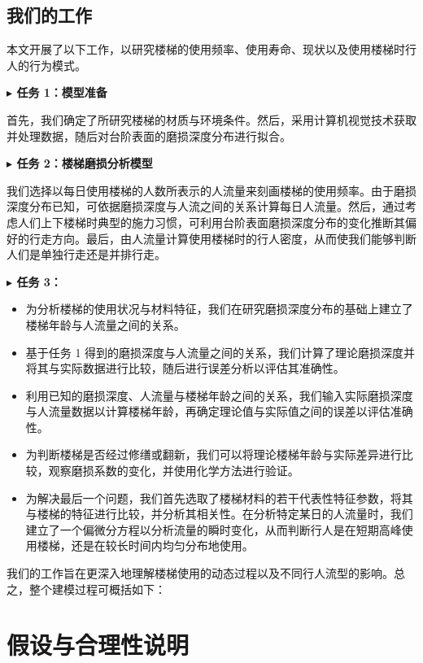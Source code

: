 \documentclass[11pt,a4paper]{ctexart}
\begin{document}
\subsection{我们的工作}

本文开展了以下工作，以研究楼梯的使用频率、使用寿命、现状以及使用楼梯时行人的行为模式。

\noindent\textbf{$\blacktriangleright$ 任务 1：模型准备}

首先，我们确定了所研究楼梯的材质与环境条件。然后，采用计算机视觉技术获取并处理数据，随后对台阶表面的磨损深度分布进行拟合。

\noindent\textbf{$\blacktriangleright$ 任务 2：楼梯磨损分析模型}

我们选择以每日使用楼梯的人数所表示的人流量来刻画楼梯的使用频率。由于磨损深度分布已知，可依据磨损深度与人流之间的关系计算每日人流量。然后，通过考虑人们上下楼梯时典型的施力习惯，可利用台阶表面磨损深度分布的变化推断其偏好的行走方向。最后，由人流量计算使用楼梯时的行人密度，从而使我们能够判断人们是单独行走还是并排行走。

\noindent\textbf{$\blacktriangleright$ 任务 3：}

\begin{itemize}[leftmargin=2em,itemsep=2pt,topsep=2pt]
\item 为分析楼梯的使用状况与材料特征，我们在研究磨损深度分布的基础上建立了楼梯年龄与人流量之间的关系。
\item 基于任务 1 得到的磨损深度与人流量之间的关系，我们计算了理论磨损深度并将其与实际数据进行比较，随后进行误差分析以评估其准确性。
\item 利用已知的磨损深度、人流量与楼梯年龄之间的关系，我们输入实际磨损深度与人流量数据以计算楼梯年龄，再确定理论值与实际值之间的误差以评估准确性。
\item 为判断楼梯是否经过修缮或翻新，我们可以将理论楼梯年龄与实际差异进行比较，观察磨损系数的变化，并使用化学方法进行验证。
\item 为解决最后一个问题，我们首先选取了楼梯材料的若干代表性特征参数，将其与楼梯的特征进行比较，并分析其相关性。在分析特定某日的人流量时，我们建立了一个偏微分方程以分析流量的瞬时变化，从而判断行人是在短期高峰使用楼梯，还是在较长时间内均匀分布地使用。
\end{itemize}

我们的工作旨在更深入地理解楼梯使用的动态过程以及不同行人流型的影响。总之，整个建模过程可概括如下：

\section{假设与合理性说明}
\end{document}
